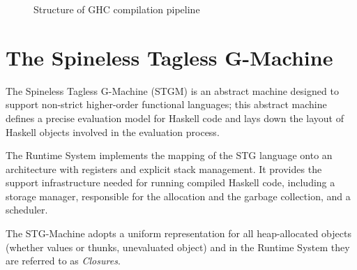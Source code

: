 \begin{figure}
\begin{center}
\end{center}
\caption{Structure of GHC compilation pipeline}
\label{fig:pipeline}
\end{figure}


\section{The Spineless Tagless G-Machine}

The Spineless Tagless G-Machine (STGM) is an abstract machine designed to support non-strict higher-order functional languages; this abstract machine defines a precise evaluation model for Haskell code and lays down the layout of Haskell objects involved in the evaluation process. \cite{export:67083}

The Runtime System implements the mapping of the STG language onto an architecture with registers and explicit stack management. It provides the support infrastructure needed for running compiled Haskell code, including a storage manager, responsible for the allocation and the garbage collection, and a scheduler.

The STG-Machine adopts a uniform representation for all heap-allocated objects (whether values or thunks, \ie unevaluated object) and in the Runtime System they are referred to as \emph{Closures}.

